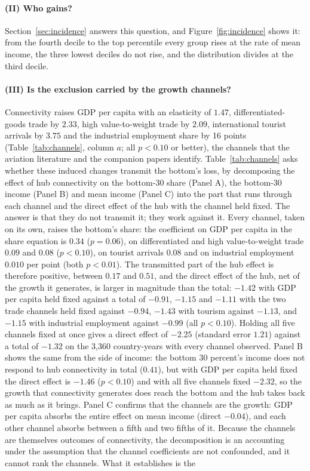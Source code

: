 

\paragraph{(II) Who gains?}
Section~\ref{sec:incidence} answers this question, and Figure~\ref{fig:incidence} shows it: from the fourth decile to the top percentile every group rises at the rate of mean income, the three lowest deciles do not rise, and the distribution divides at the third decile.

\paragraph{(III) Is the exclusion carried by the growth channels?}
Connectivity raises GDP per capita with an elasticity of $1.47$, differentiated-goods trade by $2.33$, high value-to-weight trade by $2.09$, international tourist arrivals by $3.75$ and the industrial employment share by 16 points (Table~\ref{tab:channels}, column $a$; all $p<0.10$ or better), the channels that the aviation literature and the companion papers identify. Table~\ref{tab:channels} asks whether these induced changes transmit the bottom's loss, by decomposing the effect of hub connectivity on the bottom-30 share (Panel A), the bottom-30 income (Panel B) and mean income (Panel C) into the part that runs through each channel and the direct effect of the hub with the channel held fixed. The answer is that they do not transmit it; they work against it. Every channel, taken on its own, raises the bottom's share: the coefficient on GDP per capita in the share equation is $0.34$ ($p=0.06$), on differentiated and high value-to-weight trade $0.09$ and $0.08$ ($p<0.10$), on tourist arrivals $0.08$ and on industrial employment $0.010$ per point (both $p<0.01$). The transmitted part of the hub effect is therefore positive, between $0.17$ and $0.51$, and the direct effect of the hub, net of the growth it generates, is larger in magnitude than the total: $-1.42$ with GDP per capita held fixed against a total of $-0.91$, $-1.15$ and $-1.11$ with the two trade channels held fixed against $-0.94$, $-1.43$ with tourism against $-1.13$, and $-1.15$ with industrial employment against $-0.99$ (all $p<0.10$). Holding all five channels fixed at once gives a direct effect of $-2.25$ (standard error $1.21$) against a total of $-1.32$ on the 3{,}360 country-years with every channel observed. Panel B shows the same from the side of income: the bottom 30 percent's income does not respond to hub connectivity in total ($0.41$), but with GDP per capita held fixed the direct effect is $-1.46$ ($p<0.10$) and with all five channels fixed $-2.32$, so the growth that connectivity generates does reach the bottom and the hub takes back as much as it brings. Panel C confirms that the channels are the growth: GDP per capita absorbs the entire effect on mean income (direct $-0.04$), and each other channel absorbs between a fifth and two fifths of it. Because the channels are themselves outcomes of connectivity, the decomposition is an accounting under the assumption that the channel coefficients are not confounded, and it cannot rank the channels. What it establishes is the 
